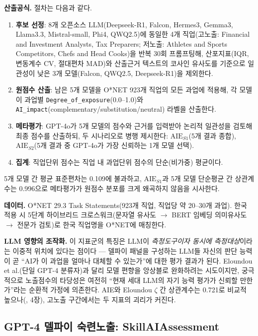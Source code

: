 \documentclass[11pt]{article}
\begin{document}
\textbf{산출공식.} 절차는 다음과 같다.
\begin{enumerate}[label=(\roman*)]
  \item \textbf{후보 선정}: 8개 오픈소스 LLM(Deepseek-R1, Falcon, Hermes3, Gemma3, Llama3.3, Mistral-small, Phi4, QWQ2.5)에 동일한 4개 직업(고노출: Financial and Investment Analysts, Tax Preparers; 저노출: Athletes and Sports Competitors, Chefs and Head Cooks)을 반복 30회 프롬프팅해, 산포지표(IQR, 변동계수 CV, 절대편차 MAD)와 산출근거 텍스트의 코사인 유사도를 기준으로 일관성이 낮은 3개 모델(Falcon, QWQ2.5, Deepseek-R1)을 제외한다.
  \item \textbf{원점수 산출}: 남은 5개 모델을 O*NET 923개 직업의 모든 과업에 적용해, 각 모델이 과업별 \texttt{Degree\_of\_exposure}(0.0--1.0)와 \texttt{AI\_impact}(complementary/substitution/neutral) 라벨을 산출한다.
  \item \textbf{메타평가}: GPT-4o가 5개 모델의 점수와 근거를 입력받아 논리적 일관성을 검토해 최종 점수를 산출하되, 두 시나리오로 병행 제시한다: $\text{AIE}_{S1}$(5개 결과 종합), $\text{AIE}_{S2}$(5개 결과 중 GPT-4o가 가장 신뢰하는 1개 모델 선택).
  \item \textbf{집계}: 직업단위 점수는 직업 내 과업단위 점수의 단순(비가중) 평균이다.
\end{enumerate}
5개 모델 간 평균 표준편차는 0.109에 불과하고, $\text{AIE}_{S1}$과 5개 모델 단순평균 간 상관계수는 0.996으로 메타평가가 원점수 분포를 크게 왜곡하지 않음을 시사한다.

\textbf{데이터.} O*NET 29.3 Task Statements(923개 직업, 직업당 약 20--30개 과업). 한국 적용 시 5단계 하이브리드 크로스워크(문자열 유사도 $\to$ BERT 임베딩 의미유사도 $\to$ 전문가 검토)로 한국 직업명을 O*NET에 매칭한다.

\textbf{LLM 영향의 조작화.} 이 지표군의 특징은 LLM이 \emph{측정도구이자 동시에 측정대상}이라는 이중적 위치에 있다는 점이다 --- 델파이 패널을 구성하는 LLM들 자신의 판단 능력이 곧 ``AI가 이 과업을 얼마나 대체할 수 있는가''에 대한 평가 결과가 된다. Eloundou et al.(단일 GPT-4 분류자)과 달리 모델 편향을 앙상블로 완화하려는 시도이지만, 궁극적으로 노출점수의 타당성은 여전히 ``현재 세대 LLM의 자기 능력 평가가 신뢰할 만한가''라는 순환적 가정에 의존한다. AIE와 Eloundou $\zeta$ 간 상관계수는 0.721로 비교적 높으나(\citealp{son-2025-llm-based-ai-job-exposure-measurement}, 4장), 고노출 구간에서는 두 지표의 괴리가 커진다.

\subsection{GPT-4 델파이 숙련노출: SkillAIAssessment}
\label{sec:skillai}
\end{document}
